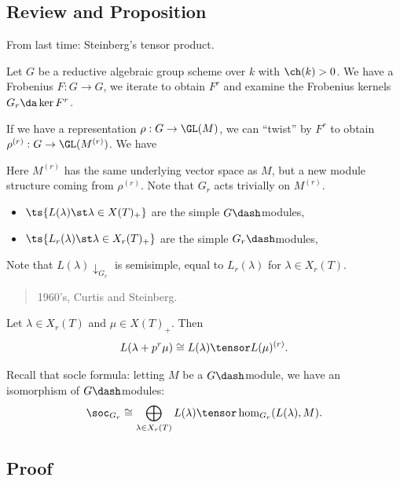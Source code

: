 \hypertarget{review-and-proposition}{%
\subsection{Review and Proposition}\label{review-and-proposition}}

From last time: Steinberg's tensor product.

Let \(G\) be a reductive algebraic group scheme over \(k\) with
\(\ch(k) > 0\). We have a Frobenius \(F:G\to G\), we iterate to obtain
\(F^r\) and examine the Frobenius kernels \(G_r\da \ker F^r\).

If we have a representation \(\rho: G\to \GL(M)\), we can ``twist'' by
\(F^r\) to obtain \(\rho^{(r)}: G \to \GL(M^{(r)})\). We have

Here \(M^{(r)}\) has the same underlying vector space as \(M\), but a
new module structure coming from \(\rho^{(r)}\). Note that \(G_r\) acts
trivially on \(M^{(r)}\).

\begin{itemize}
\tightlist
\item
  \(\ts{L(\lambda) \st \lambda \in X(T)_+}\) are the simple
  \(G\dash\)modules,
\item
  \(\ts{L_r(\lambda) \st \lambda \in X_r(T)_+}\) are the simple
  \(G_r\dash\)modules,
\end{itemize}

Note that \(L(\lambda)\downarrow_{G_r}\) is semisimple, equal to
\(L_r(\lambda)\) for \(\lambda \in X_r(T)\).

\begin{quote}
1960's, Curtis and Steinberg.
\end{quote}

\begin{proposition}[?]

Let \(\lambda \in X_r(T)\) and \(\mu \in X(T)_+\). Then
\begin{align*}  
L(\lambda + p^r \mu) \cong L(\lambda) \tensor L(\mu)^{(r)}
.\end{align*}

\end{proposition}

Recall that socle formula: letting \(M\) be a \(G\dash\)module, we have
an isomorphism of \(G\dash\)modules:
\begin{align*} 
\soc_{G_r} \cong \bigoplus_{\lambda \in X_r(T)} L(\lambda) \tensor \hom_{G_r}(L(\lambda), M)
.\end{align*}

\hypertarget{proof}{%
\subsection{Proof}\label{proof}}

